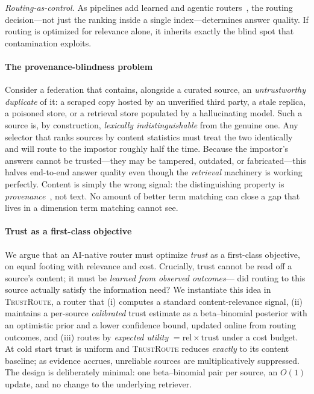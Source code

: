 \documentclass[preprint,12pt]{elsarticle}
\newcommand{\system}{\textsc{TrustRoute}}
\newcommand{\rel}{\mathrm{rel}}
\newcommand{\trust}{\mathrm{trust}}
\begin{document}
\emph{Routing-as-control.} As pipelines add learned and agentic
routers~\cite{singh2025agentic,zhang2025ragrouter}, the routing decision---not
just the ranking inside a single index---determines answer quality. If routing is
optimized for relevance alone, it inherits exactly the blind spot that
contamination exploits.

\paragraph*{The provenance-blindness problem}
Consider a federation that contains, alongside a curated source, an
\emph{untrustworthy duplicate} of it: a scraped copy hosted by an unverified
third party, a stale replica, a poisoned store, or a retrieval store populated by
a hallucinating model. Such a source is, by construction, \emph{lexically
indistinguishable} from the genuine one. Any selector that ranks sources by
content statistics must treat the two identically and will route to the impostor
roughly half the time. Because the impostor's answers cannot be trusted---they
may be tampered, outdated, or fabricated---this halves end-to-end answer quality
even though the \emph{retrieval} machinery is working perfectly. Content is simply
the wrong signal: the distinguishing property is
\emph{provenance}~\cite{buneman2001why}, not text. No amount of better term
matching can close a gap that lives in a dimension term matching cannot see.

\paragraph*{Trust as a first-class objective}
We argue that an AI-native router must optimize \emph{trust} as a first-class
objective, on equal footing with relevance and cost. Crucially, trust cannot be
read off a source's content; it must be \emph{learned from observed outcomes}---
did routing to this source actually satisfy the information need? We instantiate
this idea in \system, a router that (i) computes a standard content-relevance
signal, (ii) maintains a per-source \emph{calibrated} trust estimate as a
beta--binomial posterior with an optimistic prior and a lower confidence bound,
updated online from routing outcomes, and (iii) routes by \emph{expected utility}
$=\rel\times\trust$ under a cost budget. At cold start trust is uniform and
\system{} reduces \emph{exactly} to its content baseline; as evidence accrues,
unreliable sources are multiplicatively suppressed. The design is deliberately
minimal: one beta--binomial pair per source, an $O(1)$ update, and no change to
the underlying retriever.
\end{document}
